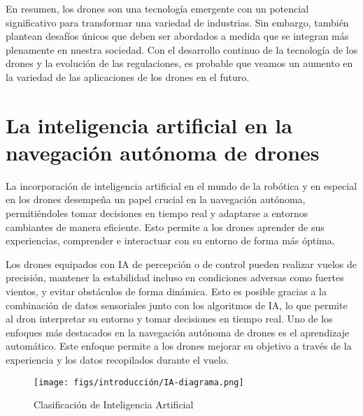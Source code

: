 En resumen, los drones son una tecnología emergente con un potencial significativo
para transformar una variedad de industrias. Sin embargo, también plantean desafíos únicos que deben ser abordados a medida que se integran más plenamente en nuestra
sociedad. Con el desarrollo continuo de la tecnología de los drones y la evolución de las
regulaciones, es probable que veamos un aumento en la variedad de las aplicaciones de
los drones en el futuro. 


\section{La inteligencia artificial en la navegación autónoma de drones}
\label{sec:IA}

La incorporación de inteligencia artificial en el mundo de la robótica y en especial en los drones desempeña un papel crucial en la navegación autónoma, permitiéndoles tomar decisiones en 
tiempo real y adaptarse 
a entornos cambiantes de manera eficiente. Esto permite a los drones aprender de sus experiencias, comprender e interactuar con su entorno de forma más óptima. 

Los drones equipados con IA de percepción o de control pueden realizar vuelos de precisión, mantener la estabilidad incluso en condiciones adversas como fuertes vientos, y evitar obstáculos 
de forma dinámica. Esto es posible gracias a la combinación de datos sensoriales junto con los algoritmos de IA, lo que permite 
al dron interpretar su entorno y tomar decisiones en tiempo real. Uno de los enfoques más destacados en la navegación autónoma de drones es el aprendizaje automático. Este enfoque permite a los drones mejorar su objetivo a través de la experiencia 
y los datos recopilados durante el vuelo. 

\begin{figure} [H]
  \begin{center}
    \texttt{[image: figs/introducción/IA-diagrama.png]}
  \end{center}
  \caption{Clasificación de Inteligencia Artificial \cite{IA}}
  \label{fig:ClasificaciónIA}
  \vspace{-1.5em}
\end{figure}

